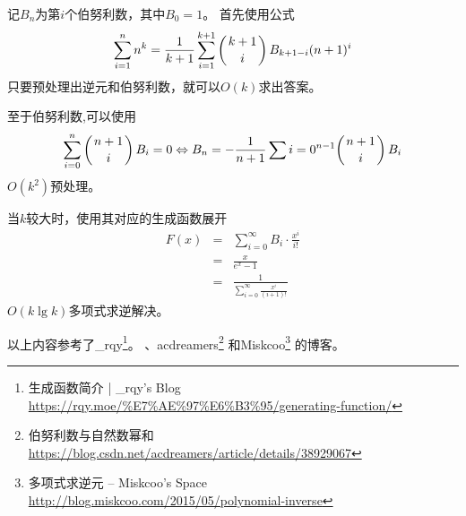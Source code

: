 记$B_n$为第$i$个伯努利数，其中$B_0=1$。
首先使用公式
\begin{displaymath}
	\sum_{i=1}^n{n^k}=\frac{1}{k+1}\sum_{i=1}^{k+1}{\left(k+1 \atop i\right)B_{k+1-i}(n+1)^i}
\end{displaymath}
只要预处理出逆元和伯努利数，就可以$O(k)$求出答案。

至于伯努利数,可以使用
\begin{displaymath}
	\sum_{i=0}^n{\left(n+1 \atop i\right)B_i}=0
	\Leftrightarrow
	B_n=-\frac{1}{n+1}\sum{i=0}^{n-1}{\left(n+1 \atop i\right)B_i}
\end{displaymath}
$O(k^2)$预处理。

当$k$较大时，使用其对应的生成函数展开
\begin{eqnarray*}
    F(x)&=&\sum_{i=0}^\infty{B_i\cdot\frac{x^i}{i!}}\\
    &=&\frac{x}{e^x-1}\\
	&=&\frac{1}{\displaystyle \sum_{i=0}^\infty{\frac{x^i}{(i+1)!}}}
\end{eqnarray*}
$O(k\lg k)$多项式求逆解决。

以上内容参考了\_rqy\footnote{生成函数简介 | \_rqy's Blog\\
	\url{https://rqy.moe/\%E7\%AE\%97\%E6\%B3\%95/generating-function/}
}。
、acdreamers\footnote{伯努利数与自然数幂和
	\url{https://blog.csdn.net/acdreamers/article/details/38929067}
}
和Miskcoo\footnote{多项式求逆元 – Miskcoo's Space
	\url{http://blog.miskcoo.com/2015/05/polynomial-inverse}
}
的博客。
